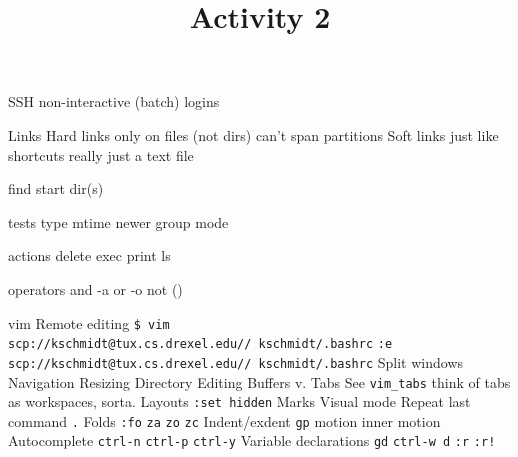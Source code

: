 \documentclass{article}
\title{Activity 2}
\author\myName
\begin{document}
\maketitle


\begin{outline}

\1 SSH
	\2 non-interactive (batch) logins

\1 Links
	\2 Hard links
		\3 only on files (not dirs)
		\3 can't span partitions
	\2 Soft links
		\3 just like shortcuts
		\3 really just a text file

\1 find
	\2 start dir(s)

	\2 tests
		\3 type
		\3 mtime
		\3 newer
		\3 group
		\3 mode

	\2 actions
		\3 delete
		\3 exec
		\3 print
		\3 ls

	\2 operators
		\3 and -a
		\3 or -o
		\3 not
		\3 ()

\1 vim
	\2 Remote editing
		\3 \texttt{\$ vim scp://kschmidt@tux.cs.drexel.edu//~kschmidt/.bashrc}
		\3 \texttt{:e scp://kschmidt@tux.cs.drexel.edu//~kschmidt/.bashrc}
	\2 Split windows
		\3 Navigation
		\3 Resizing
		\3 Directory Editing
	\2 Buffers v. Tabs
		\3  See \texttt{vim\_tabs}
		\3  think of tabs as workspaces, sorta.  Layouts
		\3	\texttt{:set hidden}
	\2 Marks
	\2 Visual mode
	\2 Repeat last command
		\3 \texttt{.}
	\2 Folds
		\3 \texttt{:fo}
		\3 \texttt{za}
		\3 \texttt{zo}
		\3 \texttt{zc}
	\2 Indent/exdent
	\2 \texttt{gp}
		\3 motion
		\3 inner motion
	\2 Autocomplete
		\3 \texttt{ctrl-n}
		\3 \texttt{ctrl-p}
		\3 \texttt{ctrl-y}
	\2 Variable declarations
		\3 \texttt{gd}
		\3 \texttt{ctrl-w d}
	\2 \texttt{:r}
	\2 \texttt{:r!}

\end{outline}
\end{document}
